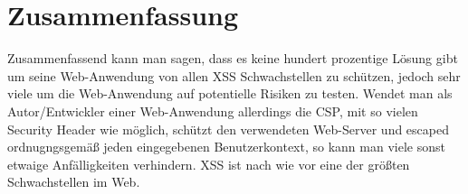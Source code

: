 \section{Zusammenfassung}

Zusammenfassend kann man sagen, dass es keine hundert prozentige Lösung gibt um seine Web-Anwendung von allen XSS Schwachstellen zu schützen, jedoch sehr viele um die Web-Anwendung auf potentielle Risiken zu testen. Wendet man als Autor/Entwickler einer Web-Anwendung allerdings die CSP, mit so vielen Security Header wie möglich, schützt den verwendeten Web-Server und escaped ordnugngsgemäß jeden eingegebenen Benutzerkontext, so kann man viele sonst etwaige Anfälligkeiten verhindern. XSS ist nach wie vor eine der größten Schwachstellen im Web.